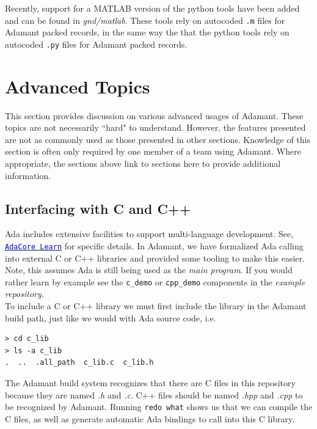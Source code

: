 Recently, support for a MATLAB version of the python tools have been added and can be found in \textit{gnd/matlab}. These tools rely on autocoded \texttt{.m} files for Adamant packed records, in the same way the that the python tools rely on autocoded \texttt{.py} files for Adamant packed records.

\newpage
\section{Advanced Topics}

This section provides discussion on various advanced usages of Adamant. These topics are not necessarily ``hard" to understand. However, the features presented are not as commonly used as those presented in other sections. Knowledge of this section is often only required by one member of a team using Adamant. Where appropriate, the sections above link to sections here to provide additional information.

\subsection{Interfacing with C and C++} \label{C Interfacing}

Ada includes extensive facilities to support multi-language development. See, \href{https://learn.adacore.com/courses/intro-to-embedded-sys-prog/chapters/multi_language_development.html}{\texttt{\textcolor{blue}{AdaCore Learn}}} for specific details. In Adamant, we have formalized Ada calling into external C or C++ libraries and provided some tooling to make this easier. Note, this assumes Ada is still being used as the \textit{main program}. If you would rather learn by example see the \texttt{c\_demo} or \texttt{cpp\_demo} components in the \textit{example repository}. \\

To include a C or C++ library we must first include the library in the Adamant build path, just like we would with Ada source code, i.e.

\vspace{5mm} %
\begin{verbatim}
> cd c_lib
> ls -a c_lib
.  ..  .all_path  c_lib.c  c_lib.h
\end{verbatim}
\vspace{5mm} %

The Adamant build system recognizes that there are C files in this repository because they are named \textit{.h} and \textit{.c}. C++ files should be named \textit{.hpp} and \textit{.cpp} to be recognized by Adamant. Running \texttt{redo what} shows us that we can compile the C files, as well as generate automatic Ada bindings to call into this C library.

